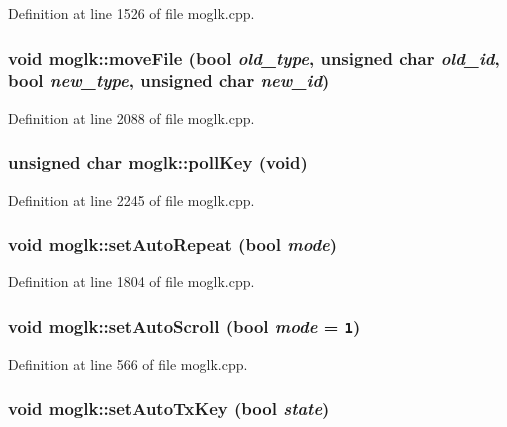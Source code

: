Definition at line 1526 of file moglk.cpp.\hypertarget{classmoglk_c2bcc785f03c46e32f27486704bd559a}{
\subsubsection[{moveFile}]{\setlength{\rightskip}{0pt plus 5cm}void moglk::moveFile (bool {\em old\_\-type}, \/  unsigned char {\em old\_\-id}, \/  bool {\em new\_\-type}, \/  unsigned char {\em new\_\-id})}}
\label{classmoglk_c2bcc785f03c46e32f27486704bd559a}




Definition at line 2088 of file moglk.cpp.\hypertarget{classmoglk_7892be0a8494f02f08f57981d31932cd}{
\subsubsection[{pollKey}]{\setlength{\rightskip}{0pt plus 5cm}unsigned char moglk::pollKey (void)}}
\label{classmoglk_7892be0a8494f02f08f57981d31932cd}




Definition at line 2245 of file moglk.cpp.\hypertarget{classmoglk_7679c4288b4ff96cf0259dbda8a852e7}{
\subsubsection[{setAutoRepeat}]{\setlength{\rightskip}{0pt plus 5cm}void moglk::setAutoRepeat (bool {\em mode})}}
\label{classmoglk_7679c4288b4ff96cf0259dbda8a852e7}




Definition at line 1804 of file moglk.cpp.\hypertarget{classmoglk_38e9c9bda5fbe192d696ae67246c0bef}{
\subsubsection[{setAutoScroll}]{\setlength{\rightskip}{0pt plus 5cm}void moglk::setAutoScroll (bool {\em mode} = {\tt 1})}}
\label{classmoglk_38e9c9bda5fbe192d696ae67246c0bef}




Definition at line 566 of file moglk.cpp.\hypertarget{classmoglk_60acc221e5d147e977aead13e60b9cc2}{
\subsubsection[{setAutoTxKey}]{\setlength{\rightskip}{0pt plus 5cm}void moglk::setAutoTxKey (bool {\em state})}}
\label{classmoglk_60acc221e5d147e977aead13e60b9cc2}




